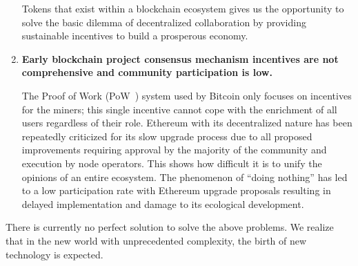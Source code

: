 \begin{enumerate}
	Tokens that exist within a blockchain ecosystem gives us the opportunity to solve the basic dilemma of decentralized collaboration by providing sustainable incentives to build a prosperous economy.

	\item

	\textbf{Early blockchain project consensus mechanism incentives are not comprehensive and community participation is low.}

	The Proof of Work (PoW~\cite{pow}) system used by Bitcoin only focuses on incentives for the miners; this single incentive cannot cope with the enrichment of all users regardless of their role. Ethereum with its decentralized nature has been repeatedly criticized for its slow upgrade process due to all proposed improvements requiring approval by the majority of the community and execution by node operators. This shows how difficult it is to unify the opinions of an entire ecosystem. The phenomenon of “doing nothing” has led to a low participation rate with Ethereum upgrade proposals resulting in delayed implementation and damage to its ecological development.

\end{enumerate}

There is currently no perfect solution to solve the above problems. We realize that in the new world with unprecedented complexity, the birth of new technology is expected.
